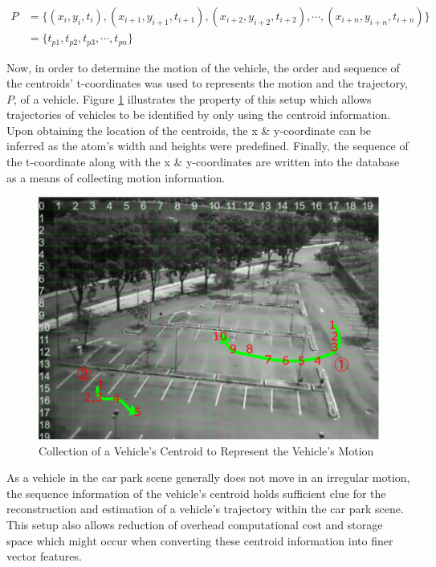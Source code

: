 \begin{align}
    P &= \{ (x_i, y_i, t_i), (x_{i+1}, y_{i+1}, t_{i+1}), (x_{i+2}, y_{i+2}, t_{i+2}), \dotsb,(x_{i+n}, y_{i+n}, t_{i+n})\}  \nonumber \\
      &= \{ t_{p1}, t_{p2}, t_{p3}, \dotsb, t_{pn}\}
\end{align}


Now, in order to determine the motion of the vehicle, the order and sequence of the centroids' t-coordinates was used to represents the motion and the trajectory, $P$, of a vehicle. Figure \ref{fig:motionExample} illustrates the property of this setup which allows trajectories of vehicles to be identified by only using the centroid information. Upon obtaining the location of the centroids, the x \& y-coordinate can be inferred as the atom's width and heights were predefined. Finally, the sequence of the t-coordinate along with the x \& y-coordinates are written into the database as a means of collecting motion information.

\begin{figure}[hbt!]\centering
\includegraphics[width=.9\textwidth]{image/general/trajectorysample2.png}
\caption{Collection of a Vehicle's Centroid to Represent the Vehicle's Motion}
\label{fig:motionExample}
\end{figure}

As a vehicle in the car park scene generally does not move in an irregular motion, the sequence information of the vehicle's centroid holds sufficient clue for the reconstruction and estimation of a vehicle's trajectory within the car park scene. This setup also allows reduction of overhead computational cost and storage space which might occur when converting these centroid information into finer vector features.


